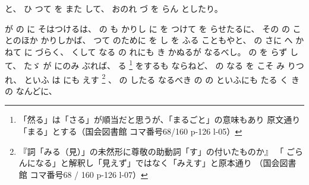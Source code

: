 %
と、
%
ひ
つて
を
また
して、
%
おのれ
づ
を
らん
としたり。

%
が
の
に
そはつけるは、
%
の
も%
かりし
に
を
つけて
を
らせたるに、
%
その
の
ことのほか
かりしかば、
%
つて
のために
を
し
%
を
ふる
こともやと、
%
の
さに
へ
かねて
に
づらく、
%
くして
なる
の%
れにも
%
き
かぬるが
なるべし。
%
の%
を
らず
して、
%
たゞ%
が
にのみ
ぶれば、
%
る
\footnote{「然る」は「さる」が順当だと思うが、「まるごと」の意味もあり
  原文通り「まる」とする（国会図書館 コマ番号68/160 p-126 l-05）}%
をするも
ならねど、
%
の
なる
を
こそ
み
りつれ、
%
といふ
は
にも
えす
\footnote{『詞「みる（見）」の未然形に尊敬の助動詞「す」の付いたものか』
  「 ごらんになる」と解釈し「見えず」ではなく「みえす」と原本通り
  （国会図書館 コマ番号68 / 160 p-126 l-07）}%
、
%
の
したる
なるべき
の
の
といふにも
たる
く
き
の
なんどに、
%
